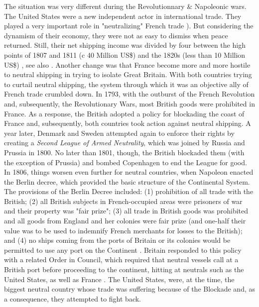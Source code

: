 \documentclass[12pt,a4paper,notitlepage,english]{article}
\begin{document}
  
The situation was very different during the Revolutionnary \& Napoleonic wars.
The United States were a new independent actor in international trade.
They played a very important role in "neutralizing" French trade \citep{Marzagalli2005,Marzagalli2015}).
But considering the dynamism of their economy, they were not as easy to dismiss when peace returned.
Still, their net shipping income was divided by four between the high points of 1807 and 1811 (c 40 Million US\$) and the 1820s (less than 10 Million US\$) \cite[series U-3 and U-10]{UnitedStatesBureauoftheCensus1975}, see also \cite[tables A-4 and B-2]{North1960}.
Another change was that France become more and more hostile to neutral shipping in trying to isolate Great Britain.
With both countries trying to curtail neutral shipping, the system through which it was an objective ally of French trade crumbled down.
In 1793, with the outburst of the French Revolution and, subsequently, the Revolutionary Wars, most British goods were prohibited in France.
As a response, the British adopted a policy for blockading the coast of France and, subsequently, both countries took action against neutral shipping.
A year later, Denmark and Sweden attempted again to enforce their rights by creating a \textit{Second League of Armed Neutrality}, which was joined by Russia and Prussia in 1800.
No later than 1801, though, the British blockaded them (with the exception of Prussia) and bombed Copenhagen to end the League for good.
In 1806, things worsen even further for neutral countries, when Napoleon enacted the Berlin decree, which provided the basic structure of the Continental System.
The provisions of the Berlin Decree included: (1) prohibition of all trade with the British; (2) all British subjects in French-occupied areas were prisoners of war and their property was "fair prize"; (3) all trade in British goods was prohibited and all goods from England and her colonies were fair prize (and one-half their value was to be used to indemnify French merchants for losses to the British); and (4) no ships coming from the ports of Britain or its colonies would be permitted to use any port on the Continent \citep{Davis2006}.
Britain responded to this policy with a related Order in Council, which required that neutral vessels call at a British port before proceeding to the continent, hitting at neutrals such as the United States, as well as France \citep{Davis2006}.
The United States, were, at the time, the biggest neutral country whose trade was suffering because of the Blockade and, as a consequence, they attempted to fight back.
\end{document}
